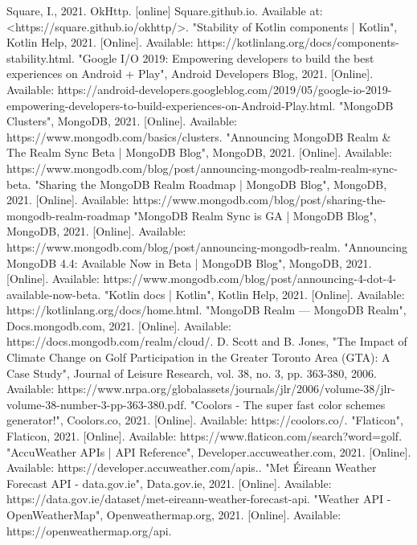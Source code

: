 \begin{thebibliography}{MT1}
 Square, I., 2021. OkHttp. [online] Square.github.io. Available at: <https://square.github.io/okhttp/>.
 "Stability of Kotlin components | Kotlin", Kotlin Help, 2021. [Online]. Available: https://kotlinlang.org/docs/components-stability.html.
 "Google I/O 2019: Empowering developers to build the best experiences on Android + Play", Android Developers Blog, 2021. [Online]. Available: https://android-developers.googleblog.com/2019/05/google-io-2019-empowering-developers-to-build-experiences-on-Android-Play.html.
 "MongoDB Clusters", MongoDB, 2021. [Online]. Available: https://www.mongodb.com/basics/clusters. 
 "Announcing MongoDB Realm \& The Realm Sync Beta | MongoDB Blog", MongoDB, 2021. [Online]. Available: https://www.mongodb.com/blog/post/announcing-mongodb-realm-realm-sync-beta.
 "Sharing the MongoDB Realm Roadmap | MongoDB Blog", MongoDB, 2021. [Online]. Available: https://www.mongodb.com/blog/post/sharing-the-mongodb-realm-roadmap
 "MongoDB Realm Sync is GA | MongoDB Blog", MongoDB, 2021. [Online]. Available: https://www.mongodb.com/blog/post/announcing-mongodb-realm.
"Announcing MongoDB 4.4: Available Now in Beta | MongoDB Blog", MongoDB, 2021. [Online]. Available: https://www.mongodb.com/blog/post/announcing-4-dot-4-available-now-beta.
"Kotlin docs | Kotlin", Kotlin Help, 2021. [Online]. Available: https://kotlinlang.org/docs/home.html.
"MongoDB Realm — MongoDB Realm", Docs.mongodb.com, 2021. [Online]. Available: https://docs.mongodb.com/realm/cloud/. 
D. Scott and B. Jones, "The Impact of Climate Change on Golf Participation in the Greater Toronto Area (GTA): A Case Study", Journal of Leisure Research, vol. 38, no. 3, pp. 363-380, 2006. Available: https://www.nrpa.org/globalassets/journals/jlr/2006/volume-38/jlr-volume-38-number-3-pp-363-380.pdf.
"Coolors - The super fast color schemes generator!", Coolors.co, 2021. [Online]. Available: https://coolors.co/. 
"Flaticon", Flaticon, 2021. [Online]. Available: https://www.flaticon.com/search?word=golf.
"AccuWeather APIs | API Reference", Developer.accuweather.com, 2021. [Online]. Available: https://developer.accuweather.com/apis..
"Met Éireann Weather Forecast API - data.gov.ie", Data.gov.ie, 2021. [Online]. Available: https://data.gov.ie/dataset/met-eireann-weather-forecast-api.
"Weather API - OpenWeatherMap", Openweathermap.org, 2021. [Online]. Available: https://openweathermap.org/api.

\end{thebibliography}
